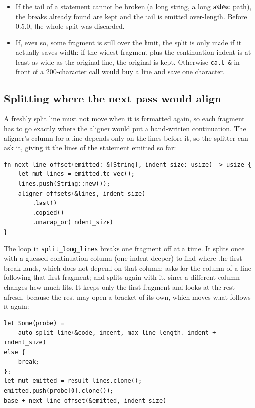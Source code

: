 \documentclass[11pt,a4paper,openany]{book}
\newcommand{\code}[1]{\texttt{\small #1}}
\begin{document}
\begin{itemize}
  \item If the tail of a statement cannot be broken (a long string, a long
    \code{a\%b\%c} path), the breaks already found are kept and the tail is
    emitted over-length. Before 0.5.0, the whole split was discarded.
  \item If, even so, some fragment is still over the limit, the split is only
    made if it actually saves width: if the widest fragment plus the
    continuation indent is at least as wide as the original line, the
    original is kept. Otherwise \code{call \&} in front of a 200-character
    call would buy a line and save one character.
\end{itemize}

\subsection{Splitting where the next pass would align}

A freshly split line must not move when it is formatted again, so each
fragment has to go exactly where the aligner would put a hand-written
continuation. The aligner's column for a line depends only on the lines before
it, so the splitter can ask it, giving it the lines of the statement emitted
so far:

\begin{lstlisting}[style=rust]
fn next_line_offset(emitted: &[String], indent_size: usize) -> usize {
    let mut lines = emitted.to_vec();
    lines.push(String::new());
    aligner_offsets(&lines, indent_size)
        .last()
        .copied()
        .unwrap_or(indent_size)
}
\end{lstlisting}

The loop in \code{split\_long\_lines} breaks one fragment off at a time. It
splits once with a guessed continuation column (one indent deeper) to find
where the first break lands, which does not depend on that column; asks for
the column of a line following that first fragment; and splits again with it,
since a different column changes how much fits. It keeps only the first
fragment and looks at the rest afresh, because the rest may open a bracket of
its own, which moves what follows it again:

\begin{lstlisting}[style=rust]
let Some(probe) =
    auto_split_line(&code, indent, max_line_length, indent + indent_size)
else {
    break;
};
let mut emitted = result_lines.clone();
emitted.push(probe[0].clone());
base + next_line_offset(&emitted, indent_size)
\end{lstlisting}
\end{document}
